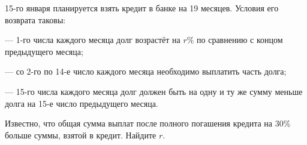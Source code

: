 \begin{ex}
	\begin{condition}
	15-го января планируется взять кредит в банке на 19 месяцев. Условия его возврата таковы:
	
	--- 1-го числа каждого месяца долг возрастёт на \( r \% \) по сравнению с концом предыдущего месяца;
	
	--- со 2-го по 14-е число каждого месяца необходимо выплатить часть долга;
	
	--- 15-го числа каждого месяца долг должен быть на одну и ту же сумму меньше долга на 15-е число предыдущего месяца.
	
	Известно, что общая сумма выплат после полного погашения кредита на 30\% больше суммы, взятой в кредит. Найдите \( r \).
	\end{condition}
\end{ex}
